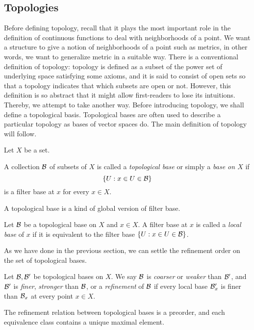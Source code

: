 \documentclass{../crs}
\begin{document}
\subsection{Topologies}
Before defining topology, recall that it plays the most important role in the definition of continuous functions to deal with neighborhoods of a point.
We want a structure to give a notion of neighborhoods of a point such as metrics, in other words, we want to generalize metric in a suitable way.
There is a conventional definition of topology: topology is defined as a subset of the power set of underlying space satisfying some axioms, and it is said to consist of open sets so that a topology indicates that which subsets are open or not.
However, this definition is so abstract that it might allow first-readers to lose its intuitions.
Thereby, we attempt to take another way.
Before introducing topology, we shall define a topological basis.
Topological bases are often used to describe a particular topology as bases of vector spaces do.
The main definition of topology will follow.

Let $X$ be a set.
\begin{defn}
A collection $\mathcal{B}$ of subsets of $X$ is called a \emph{topological base} or simply a \emph{base on $X$} if
\[\{U:x\in U\in\mathcal{B}\}\]
is a filter base at $x$ for every $x\in X$.
\end{defn}

A topological base is a kind of global version of filter base.

\begin{defn}
Let $\mathcal{B}$ be a topological base on $X$ and $x\in X$.
A filter base at $x$ is called a \emph{local base} of $x$ if it is equivalent to the filter base $\{U:x\in U\in\mathcal{B}\}$.
\end{defn}

As we have done in the previous section, we can settle the refinement order on the set of topological bases.

\begin{defn}
Let $\mathcal{B},\mathcal{B}'$ be topological bases on $X$.
We say $\mathcal{B}$ is \emph{coarser} or \emph{weaker} than $\mathcal{B}'$, and $\mathcal{B}'$ is \emph{finer}, \emph{stronger} than $\mathcal{B}$, or a \emph{refinement} of $\mathcal{B}$ if every local base $\mathcal{B}'_x$ is finer than $\mathcal{B}_x$ at every point $x\in X$.
\end{defn}
\begin{prop}
The refinement relation between topological bases is a preorder, and each equivalence class contains a unique maximal element.
\end{prop}
\begin{pf}
\end{pf}
\end{document}
